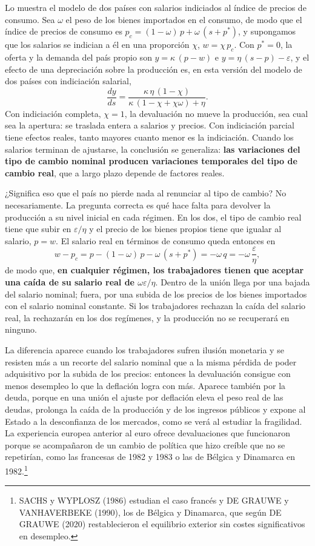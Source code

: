 \documentclass[10pt,a4paper]{article}
\begin{document}
Lo muestra el modelo de dos países con salarios indiciados al índice de precios de consumo. Sea $\omega$ el peso de los bienes importados en el consumo, de modo que el índice de precios de consumo es $p_c=(1-\omega)\,p+\omega\,(s+p^*)$, y supongamos que los salarios se indician a él en una proporción $\chi$, $w=\chi\,p_c$. Con $p^*=0$, la oferta y la demanda del país propio son $y=\kappa\,(p-w)$ e $y=\eta\,(s-p)-\varepsilon$, y el efecto de una depreciación sobre la producción es, en esta versión del modelo de dos países con indiciación salarial,
$$\frac{dy}{ds}=\frac{\kappa\,\eta\,(1-\chi)}{\kappa\,(1-\chi+\chi\omega)+\eta}.$$
Con indiciación completa, $\chi=1$, la devaluación no mueve la producción, sea cual sea la apertura: se traslada entera a salarios y precios. Con indiciación parcial tiene efectos reales, tanto mayores cuanto menor es la indiciación. Cuando los salarios terminan de ajustarse, la conclusión se generaliza: \textbf{las variaciones del tipo de cambio nominal producen variaciones temporales del tipo de cambio real}, que a largo plazo depende de factores reales.

¿Significa eso que el país no pierde nada al renunciar al tipo de cambio? No necesariamente. La pregunta correcta es qué hace falta para devolver la producción a su nivel inicial en cada régimen. En los dos, el tipo de cambio real tiene que subir en $\varepsilon/\eta$ y el precio de los bienes propios tiene que igualar al salario, $p=w$. El salario real en términos de consumo queda entonces en
$$w-p_c=p-(1-\omega)\,p-\omega\,(s+p^*)=-\omega\,q=-\omega\,\frac{\varepsilon}{\eta},$$
de modo que, \textbf{en cualquier régimen, los trabajadores tienen que aceptar una caída de su salario real de $\omega\varepsilon/\eta$}. Dentro de la unión llega por una bajada del salario nominal; fuera, por una subida de los precios de los bienes importados con el salario nominal constante. Si los trabajadores rechazan la caída del salario real, la rechazarán en los dos regímenes, y la producción no se recuperará en ninguno.

La diferencia aparece cuando los trabajadores sufren ilusión monetaria y se resisten más a un recorte del salario nominal que a la misma pérdida de poder adquisitivo por la subida de los precios: entonces la devaluación consigue con menos desempleo lo que la deflación logra con más. Aparece también por la deuda, porque en una unión el ajuste por deflación eleva el peso real de las deudas, prolonga la caída de la producción y de los ingresos públicos y expone al Estado a la desconfianza de los mercados, como se verá al estudiar la fragilidad. La experiencia europea anterior al euro ofrece devaluaciones que funcionaron porque se acompañaron de un cambio de política que hizo creíble que no se repetirían, como las francesas de 1982 y 1983 o las de Bélgica y Dinamarca en 1982.\footnote{%
    SACHS y WYPLOSZ (1986) estudian el caso francés y DE GRAUWE y VANHAVERBEKE (1990), los de Bélgica y Dinamarca, que según DE GRAUWE (2020) restablecieron el equilibrio exterior sin costes significativos en desempleo.
}
\end{document}
